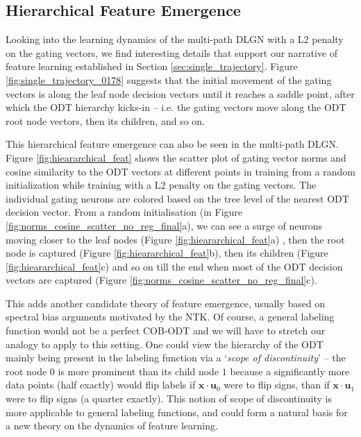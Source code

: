 \documentclass{article}
\theoremstyle{plain}
\theoremstyle{definition}
\theoremstyle{remark}
\newcommand{\1}{{\mathbf 1}}
\newcommand{\0}{{\mathbf 0}}
\newcommand{\x}{{\mathbf x}}
\newcommand{\bu}{{\mathbf u}}
\renewcommand{\>}{{\rightarrow}}
\begin{document}
\subsection{Hierarchical Feature Emergence}
\label{sec:hierarchical_feature_emergence}



Looking into the learning dynamics of the multi-path DLGN with a L2 penalty on the gating vectors, we find interesting details that support our narrative of feature learning established in Section \ref{sec:single_trajectory}. Figure \ref{fig:single_trajectory_0178} suggests that the initial movement of the gating vectors is along the leaf node decision vectors until it reaches a saddle point, after which the ODT hierarchy kicks-in -- i.e. the gating vectors move along the ODT root node vectors, then its children, and so on. 

This hierarchical feature emergence can also be seen in the multi-path DLGN. Figure \ref{fig:hieararchical_feat} shows the scatter plot of gating vector norms and cosine similarity to the ODT vectors at different points in training from a random initialization while training with a L2 penalty on the gating vectors. The individual gating neurons are colored based on the tree level of the nearest ODT decision vector. From a random initialisation (in Figure \ref{fig:norms_cosine_scatter_no_reg_final}a), we can see a surge of neurons moving closer to the leaf nodes (Figure \ref{fig:hieararchical_feat}a) , then the root node is captured (Figure \ref{fig:hieararchical_feat}b), then its children (Figure \ref{fig:hieararchical_feat}c) and so on till the end when most of the ODT decision vectors are captured (Figure \ref{fig:norms_cosine_scatter_no_reg_final}c).




This adds another candidate theory of feature emergence, usually based on spectral bias arguments motivated by the NTK. Of course, a general labeling function would not be a perfect COB-ODT and we will have to stretch our analogy to apply to this setting. One could view the hierarchy of the ODT mainly being present in the labeling function via a `\textit{scope of discontinuity}' -- the root node $0$ is more prominent than its child node $1$ because a significantly more data points (half exactly) would flip labels if $\x \cdot \bu_0$ were to flip signs, than if $\x\cdot \bu_1$ were to flip signs (a quarter exactly). This notion of scope of discontinuity is more applicable to general labeling functions, and could form a natural basis for a new theory on the dynamics of feature learning.
\end{document}
